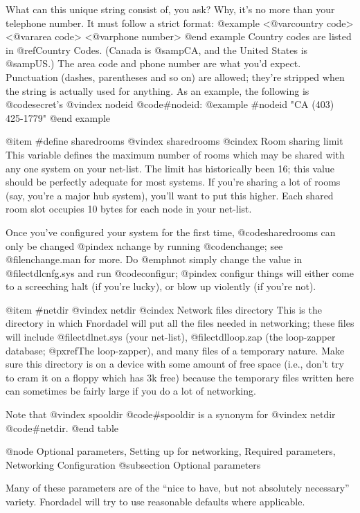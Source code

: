 What can this unique string consist of, you ask?
Why, it's no more than your telephone number.  It must follow
a strict format:
@example
<@var{country code}> <@var{area code}> <@var{phone number}>
@end example
Country codes are listed in @ref{Country Codes}.  (Canada
is @samp{CA}, and the United States is @samp{US}.)  The area code and
phone number are what you'd expect.  Punctuation (dashes,
parentheses and so on) are allowed; they're stripped when
the string is actually used for anything.  As an example,
the following is @code{secret}'s
@vindex nodeid
@code{#nodeid}:
@example
#nodeid "CA (403) 425-1779"
@end example

@item #define sharedrooms
@vindex sharedrooms
@cindex Room sharing limit
This variable defines the maximum number of rooms
which may be shared with any one system on your net-list.
The limit has historically been 16; this value should be
perfectly adequate for most systems.  If you're sharing a
lot of rooms (say, you're a major hub system), you'll want
to put this higher.  Each shared room slot occupies 10
bytes for each node in your net-list.

Once you've
configured your system for the first time,
@code{sharedrooms} can only be changed
@pindex nchange
by running @code{nchange}; see @file{nchange.man} for more.  Do @emph{not}
simply change the value in @file{ctdlcnfg.sys} and run @code{configur};
@pindex configur
things will either come to a screeching halt (if you're
lucky), or blow up violently (if you're not).

@item #netdir
@vindex netdir
@cindex Network files directory
This is the directory in which Fnordadel will
put all the files needed in networking; these files will
include @file{ctdlnet.sys} (your net-list), @file{ctdlloop.zap} (the
loop-zapper database; @pxref{The loop-zapper}), and many
files of a temporary nature.  Make sure this directory is
on a device with some amount of free space (i.e., don't try
to cram it on a floppy which has 3k free) because the
temporary files written here can sometimes be fairly large
if you do a lot of networking.

Note that
@vindex spooldir
@code{#spooldir} is a synonym for
@vindex netdir
@code{#netdir}.
@end table

@node Optional parameters, Setting up for networking, Required parameters, Networking Configuration
@subsection Optional parameters

Many of these parameters are of the ``nice to have, but
not absolutely necessary'' variety.  Fnordadel will try to use
reasonable defaults where applicable.

